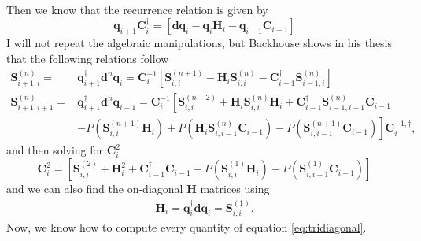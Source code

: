 Then we know that the recurrence relation is given by
\begin{equation}
    \mathbf{q}_{i+1} \mathbf{C}_i^{\dagger} = \left[\mathbf{d} \mathbf{q}_i-\mathbf{q}_{i} \mathbf{H}_i-\mathbf{q}_{i-1} \mathbf{C}_{i-1}\right]
\end{equation}
I will not repeat the algebraic manipulations, but Backhouse shows in his thesis that the following relations follow
\begin{equation}
\begin{aligned}
\mathbf{S}_{i+1, i}^{(n)}=&\mathbf{q}_{i+1}^{\dagger} \mathbf{d}^n \mathbf{q}_i=\mathbf{C}_i^{-1}\left[\mathbf{S}_{i, i}^{(n+1)}-\mathbf{H}_i \mathbf{S}_{i, i}^{(n)}-\mathbf{C}_{i-1}^{\dagger} \mathbf{S}_{i-1, i}^{(n)}\right]\\
\mathbf{S}_{i+1, i+1}^{(n)}= & \mathbf{q}_{i+1}^{\dagger} \mathbf{d}^n \mathbf{q}_{i+1}
=  \mathbf{C}_i^{-1}\left[\mathbf{S}_{i, i}^{(n+2)}+\mathbf{H}_i \mathbf{S}_{i, i}^{(n)} \mathbf{H}_i+\mathbf{C}_{i-1}^{\dagger} \mathbf{S}_{i-1, i-1}^{(n)} \mathbf{C}_{i-1}\right. \\
& \left.-P\left(\mathbf{S}_{i, i}^{(n+1)} \mathbf{H}_i\right)+P\left(\mathbf{H}_i \mathbf{S}_{i, i-1}^{(n)} \mathbf{C}_{i-1}\right)-P\left(\mathbf{S}_{i, i-1}^{(n+1)} \mathbf{C}_{i-1}\right)\right] \mathbf{C}_i^{-1, \dagger},
\end{aligned}
\end{equation}
and then solving for $\mathbf{C}_i^2$
\begin{equation}
    \mathbf{C}_i^2=\left[\mathbf{S}_{i, i}^{(2)}+\mathbf{H}_i^2+\mathbf{C}_{i-1}^{\dagger} \mathbf{C}_{i-1}-P\left(\mathbf{S}_{i, i}^{(1)} \mathbf{H}_i\right)-P\left(\mathbf{S}_{i, i-1}^{(1)} \mathbf{C}_{i-1}\right)\right]
\end{equation}
and we can also find the on-diagonal $\mathbf{H}$ matrices using
\begin{equation}
\begin{aligned}
\mathbf{H}_i=\mathbf{q}_i^{\dagger} \mathbf{d} \mathbf{q}_i=\mathbf{S}_{i, i}^{(1)} .
\end{aligned}
\end{equation}
Now, we know how to compute every quantity of equation \ref{eq:tridiagonal}.
